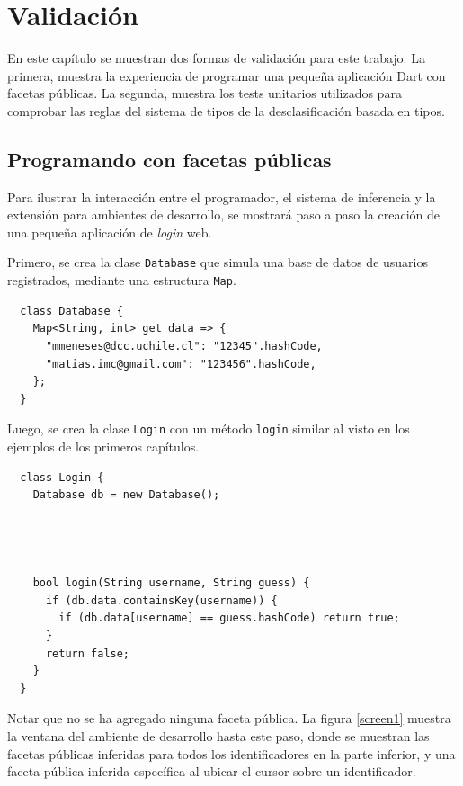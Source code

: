 \chapter{Validación}
En este capítulo se muestran dos formas de validación para este trabajo. La primera, muestra la experiencia de programar una pequeña aplicación Dart con facetas públicas. La segunda, muestra los tests unitarios utilizados para comprobar las reglas del sistema de tipos de la desclasificación basada en tipos.


\section{Programando con facetas públicas}
Para ilustrar la interacción entre el programador, el sistema de inferencia y la extensión para ambientes de desarrollo, se mostrará paso a paso la creación de una pequeña aplicación de \emph{login} web.

Primero, se crea la clase \texttt{Database} que simula una base de datos de usuarios registrados, mediante una estructura \texttt{Map}.
\vspace{0.5em}
\begin{lstlisting}
  class Database {
    Map<String, int> get data => {
      "mmeneses@dcc.uchile.cl": "12345".hashCode,
      "matias.imc@gmail.com": "123456".hashCode,
    };
  }
\end{lstlisting}

Luego, se crea la clase \texttt{Login} con un método \texttt{login} similar al visto en los ejemplos de los primeros capítulos.
\vspace{0.5em}
\begin{lstlisting}
  class Login {
    Database db = new Database();




    bool login(String username, String guess) {
      if (db.data.containsKey(username)) {
        if (db.data[username] == guess.hashCode) return true;
      }
      return false;
    }
  }
\end{lstlisting}

Notar que no se ha agregado ninguna faceta pública. La figura \ref{screen1} muestra la ventana del ambiente de desarrollo hasta este paso, donde se muestran las facetas públicas inferidas para todos los identificadores en la parte inferior, y una faceta pública inferida específica al ubicar el cursor sobre un identificador.

